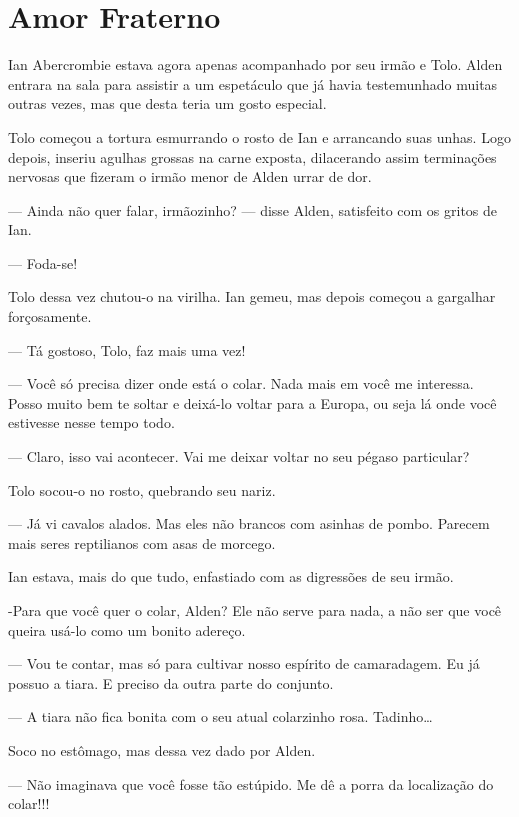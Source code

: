 \chapter{Amor Fraterno}


Ian Abercrombie estava agora apenas acompanhado por seu irmão e Tolo. Alden
entrara na sala para assistir a um espetáculo que já havia testemunhado muitas
outras vezes, mas que desta teria um gosto especial.

Tolo começou a tortura esmurrando o rosto de Ian e arrancando suas unhas. Logo
depois, inseriu agulhas grossas na carne exposta, dilacerando assim terminações
nervosas que fizeram o irmão menor de Alden urrar de dor.

--- Ainda não quer falar, irmãozinho? --- disse Alden, satisfeito com os gritos
de Ian.

--- Foda-se!

Tolo dessa vez chutou-o na virilha. Ian gemeu, mas depois começou a gargalhar
forçosamente.

--- Tá gostoso, Tolo, faz mais uma vez!

--- Você só precisa dizer onde está o colar. Nada mais em você me interessa.
Posso muito bem te soltar e deixá-lo voltar para a Europa, ou seja lá onde você
estivesse nesse tempo todo.

--- Claro, isso vai acontecer. Vai me deixar voltar no seu pégaso particular?

Tolo socou-o no rosto, quebrando seu nariz.

--- Já vi cavalos alados. Mas eles não brancos com asinhas de pombo. Parecem
mais seres reptilianos com asas de morcego.

Ian estava, mais do que tudo, enfastiado com as digressões de seu irmão.

-Para que você quer o colar, Alden? Ele não serve para nada, a não ser que você
queira usá-lo como um bonito adereço.

--- Vou te contar, mas só para cultivar nosso espírito de camaradagem. Eu já
possuo a tiara. E preciso da outra parte do conjunto.

--- A tiara não fica bonita com o seu atual colarzinho rosa. Tadinho\ldots

Soco no estômago, mas dessa vez dado por Alden.

--- Não imaginava que você fosse tão estúpido. Me dê a porra da localização do
colar!!!

